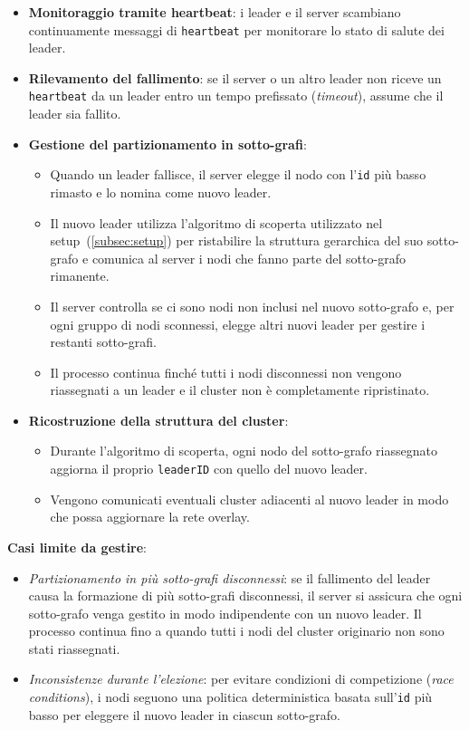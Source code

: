 \documentclass[12pt, a4paper]{report}
\begin{document}
\begin{itemize}
    \item \textbf{Monitoraggio tramite heartbeat}: i leader e il server scambiano continuamente messaggi di \texttt{heartbeat} per monitorare lo stato di salute dei leader.
    \item \textbf{Rilevamento del fallimento}: se il server o un altro leader non riceve un \texttt{heartbeat} da un leader entro un tempo prefissato (\textit{timeout}), assume che il leader sia fallito.
    \item \textbf{Gestione del partizionamento in sotto-grafi}:
    \begin{itemize}
        \item Quando un leader fallisce, il server elegge il nodo con l'\texttt{id} pi\`u basso rimasto e lo nomina come nuovo leader. 
        \item Il nuovo leader utilizza l'algoritmo di scoperta utilizzato nel setup~(\ref{subsec:setup}) per ristabilire la struttura gerarchica del suo sotto-grafo e comunica al server i nodi che fanno parte del sotto-grafo rimanente.
        \item Il server controlla se ci sono nodi non inclusi nel nuovo sotto-grafo e, per ogni gruppo di nodi sconnessi, elegge altri nuovi leader per gestire i restanti sotto-grafi.
        \item Il processo continua finché tutti i nodi disconnessi non vengono riassegnati a un leader e il cluster non \`e completamente ripristinato.
    \end{itemize}
    \item \textbf{Ricostruzione della struttura del cluster}:
    \begin{itemize}
        \item Durante l'algoritmo di scoperta, ogni nodo del sotto-grafo riassegnato aggiorna il proprio \texttt{leaderID} con quello del nuovo leader. 
        \item Vengono comunicati eventuali cluster adiacenti al nuovo leader in modo che possa aggiornare la rete overlay.
    \end{itemize}
\end{itemize}

\textbf{Casi limite da gestire}:

\begin{itemize}
    \item \textit{Partizionamento in pi\`u sotto-grafi disconnessi}: se il fallimento del leader causa la formazione di pi\`u sotto-grafi disconnessi, il server si assicura che ogni sotto-grafo venga gestito in modo indipendente con un nuovo leader. Il processo continua fino a quando tutti i nodi del cluster originario non sono stati riassegnati.
    \item \textit{Inconsistenze durante l'elezione}: per evitare condizioni di competizione (\textit{race conditions}), i nodi seguono una politica deterministica basata sull'\texttt{id} pi\`u basso per eleggere il nuovo leader in ciascun sotto-grafo.
\end{itemize}
\end{document}
